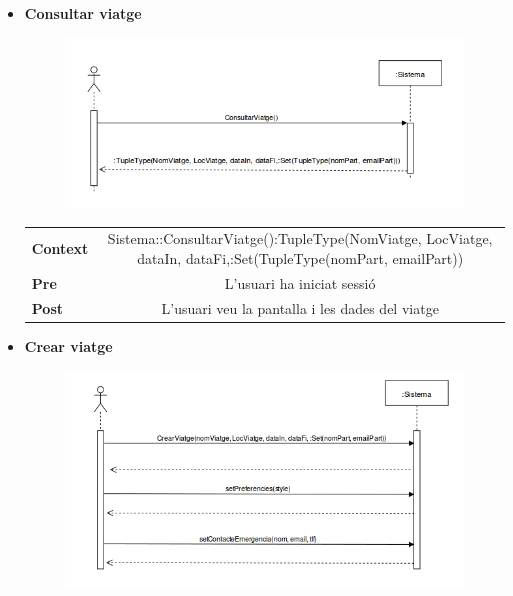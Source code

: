 \begin{itemize}
\item[]\textbf{Consultar viatge}

\begin{figure}[!h]
\centering
\includegraphics[scale=0.8]{Figures/ConsultarViatgeEC.png}
\end{figure}

\begin{table}[!h]
\centering
\begin{tabular}{l C}
\textbf{Context}  & Sistema::ConsultarViatge():TupleType(NomViatge, LocViatge, dataIn, dataFi,:Set(TupleType(nomPart, emailPart)) \\
\textbf{Pre} & L'usuari ha iniciat sessió\\
\textbf{Post} &  L'usuari veu la pantalla i les dades del viatge\\
\end{tabular}
\label{}
\end{table}

\clearpage

\item[]\textbf{Crear viatge}

\begin{figure}[!h]
\centering
\includegraphics[scale=0.8]{Figures/CrearViatgeEC.png}
\end{figure}


\end{itemize}
